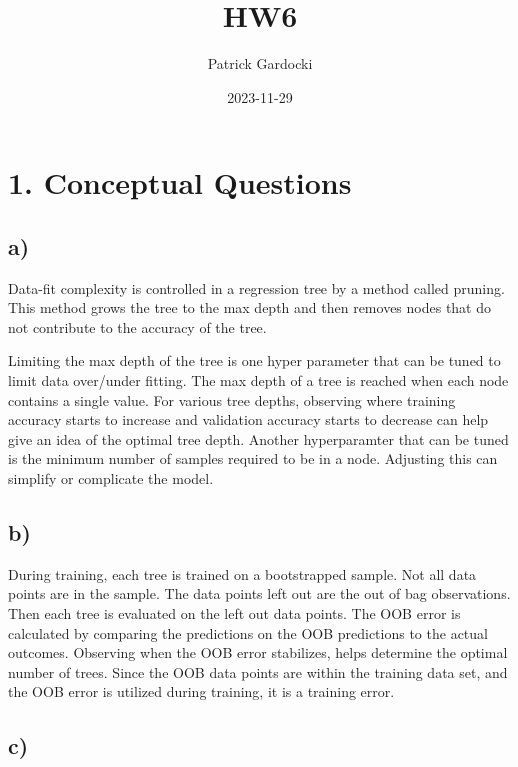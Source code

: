 \documentclass[
]{article}
\title{HW6}
\author{Patrick Gardocki}
\date{2023-11-29}
\begin{document}
\maketitle

\hypertarget{conceptual-questions}{%
\section{1. Conceptual Questions}\label{conceptual-questions}}

\hypertarget{a}{%
\subsection{a)}\label{a}}

Data-fit complexity is controlled in a regression tree by a method
called pruning. This method grows the tree to the max depth and then
removes nodes that do not contribute to the accuracy of the tree.

Limiting the max depth of the tree is one hyper parameter that can be
tuned to limit data over/under fitting. The max depth of a tree is
reached when each node contains a single value. For various tree depths,
observing where training accuracy starts to increase and validation
accuracy starts to decrease can help give an idea of the optimal tree
depth. Another hyperparamter that can be tuned is the minimum number of
samples required to be in a node. Adjusting this can simplify or
complicate the model.

\hypertarget{b}{%
\subsection{b)}\label{b}}

During training, each tree is trained on a bootstrapped sample. Not all
data points are in the sample. The data points left out are the out of
bag observations. Then each tree is evaluated on the left out data
points. The OOB error is calculated by comparing the predictions on the
OOB predictions to the actual outcomes. Observing when the OOB error
stabilizes, helps determine the optimal number of trees. Since the OOB
data points are within the training data set, and the OOB error is
utilized during training, it is a training error.

\hypertarget{c}{%
\subsection{c)}\label{c}}
\end{document}

